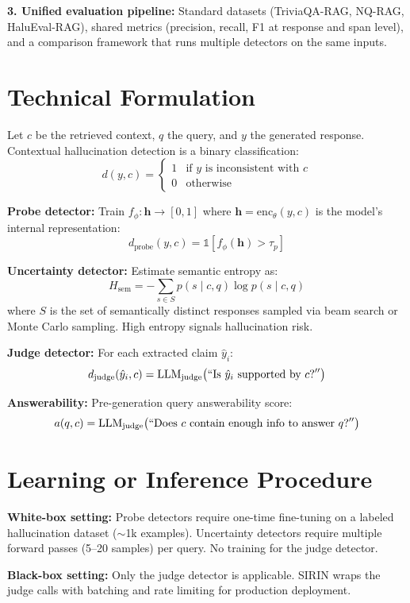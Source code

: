 \documentclass[10pt,twocolumn]{article}
\begin{document}
\textbf{3. Unified evaluation pipeline:} Standard datasets (TriviaQA-RAG, NQ-RAG,
HaluEval-RAG), shared metrics (precision, recall, F1 at response and span level),
and a comparison framework that runs multiple detectors on the same inputs.

\section{Technical Formulation}

Let $c$ be the retrieved context, $q$ the query, and $y$ the generated response.
Contextual hallucination detection is a binary classification:
\[
d(y, c) = \begin{cases} 1 & \text{if } y \text{ is inconsistent with } c \\ 0 & \text{otherwise} \end{cases}
\]

\textbf{Probe detector:} Train $f_\phi: \mathbf{h} \to [0,1]$ where
$\mathbf{h} = \mathrm{enc}_\theta(y, c)$ is the model's internal representation:
\[
d_{\mathrm{probe}}(y,c) = \mathbb{1}[f_\phi(\mathbf{h}) > \tau_p]
\]

\textbf{Uncertainty detector:} Estimate semantic entropy as:
\[
H_{\mathrm{sem}} = -\sum_{s \in S} p(s \mid c, q) \log p(s \mid c, q)
\]
where $S$ is the set of semantically distinct responses sampled via beam search or
Monte Carlo sampling. High entropy signals hallucination risk.

\textbf{Judge detector:} For each extracted claim $\hat{y}_i$:
\[
d_{\mathrm{judge}}(\hat{y}_i, c) = \mathrm{LLM}_{\mathrm{judge}}\bigl(``\text{Is }\hat{y}_i\text{ supported by }c\text{?}''\bigr)
\]

\textbf{Answerability:} Pre-generation query answerability score:
\[
a(q, c) = \mathrm{LLM}_{\mathrm{judge}}\bigl(``\text{Does }c\text{ contain enough info to answer }q\text{?}''\bigr)
\]

\section{Learning or Inference Procedure}

\textbf{White-box setting:} Probe detectors require one-time fine-tuning on a labeled
hallucination dataset ($\sim$1k examples). Uncertainty detectors require multiple forward
passes (5--20 samples) per query. No training for the judge detector.

\textbf{Black-box setting:} Only the judge detector is applicable. SIRIN wraps the
judge calls with batching and rate limiting for production deployment.
\end{document}
